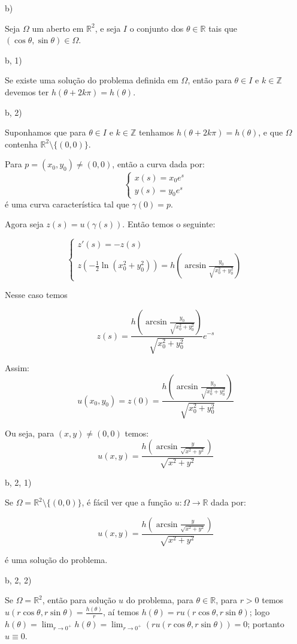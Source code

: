 \documentclass[11pt,a4paper]{article}
\begin{document}
{\bigskip
\noindent
b)

\medskip
\noindent
Seja $\Omega$ um aberto em $\mathbb{R}^2$, e seja $I$ o conjunto dos $\theta\in\mathbb{R}$ tais que $(\cos{\theta},\sin{\theta})\in\Omega$.

\bigskip
\noindent
b, 1)

\medskip
\noindent
Se existe uma solução do problema definida em $\Omega$, então para $\theta\in I$ e $k\in\mathbb{Z}$ devemos ter $h(\theta+2k\pi)=h(\theta)$.

\bigskip
\noindent
b, 2)

\medskip
\noindent
Suponhamos que para $\theta\in I$ e $k\in\mathbb{Z}$ tenhamos $h(\theta+2k\pi)=h(\theta)$, e que $\Omega$ contenha $\mathbb{R}^2\setminus\{(0,0)\}$.

\smallskip
\noindent
Para $p=(x_0,y_0)\neq(0,0)$, então a curva dada por:
\begin{equation*}
    \begin{cases}
    x(s)=x_0e^s \\
    y(s)=y_0e^s
    \end{cases}
\end{equation*}
é uma curva característica tal que $\gamma(0)=p$.

\smallskip
\noindent
Agora seja $z(s)=u(\gamma(s))$. Então temos o seguinte:

\begin{equation*}
    \begin{cases}
    z'(s)=-z(s) \\
    z\left(-\frac{1}{2}\ln{(x_0^2+y_0^2)}\right)=h\left(\arcsin\frac{y_0}{\sqrt{x_0^2+y_0^2}}\right)
    \end{cases}
\end{equation*}

\smallskip
\noindent
Nesse caso temos

\[
z(s)=\frac{h\left(\arcsin{\frac{y_0}{\sqrt{x_0^2+y_0^2}}}\right)}{\sqrt{x_0^2+y_0^2}}e^{-s}
\]

\noindent
Assim:
\[
u(x_0,y_0)=z(0)=\frac{h\left(\arcsin{\frac{y_0}{\sqrt{x_0^2+y_0^2}}}\right)}{\sqrt{x_0^2+y_0^2}}
\]

\smallskip
\noindent
Ou seja, para $(x,y)\neq (0,0)$ temos:
\[
u(x,y)=\frac{h\left(\arcsin{\frac{y}{\sqrt{x^2+y^2}}}\right)}{\sqrt{x^2+y^2}}
\]

\noindent
b, 2, 1)

\medskip
\noindent
Se $\Omega=\mathbb{R}^2\setminus\{(0,0)\}$, é fácil ver que a função $u:\Omega\rightarrow\mathbb{R}$ dada por:

\[
u(x,y)=\frac{h\left(\arcsin{\frac{y}{\sqrt{x^2+y^2}}}\right)}{\sqrt{x^2+y^2}}
\]

\noindent
é uma solução do problema.

\bigskip
\noindent
b, 2, 2)

\medskip
\noindent
Se $\Omega=\mathbb{R}^2$, então para solução $u$ do problema, para $\theta\in\mathbb{R}$, para $r>0$ temos $u(r\cos{\theta},r\sin{\theta})=\frac{h(\theta)}{r}$, aí temos $h(\theta)=ru(r\cos{\theta},r\sin{\theta})$; logo $h(\theta)=\lim_{r\rightarrow 0^+}h(\theta)=\lim_{r\rightarrow 0^+}(ru(r\cos{\theta},r\sin{\theta}))=0$; portanto $u\equiv 0$.}
\end{document}
